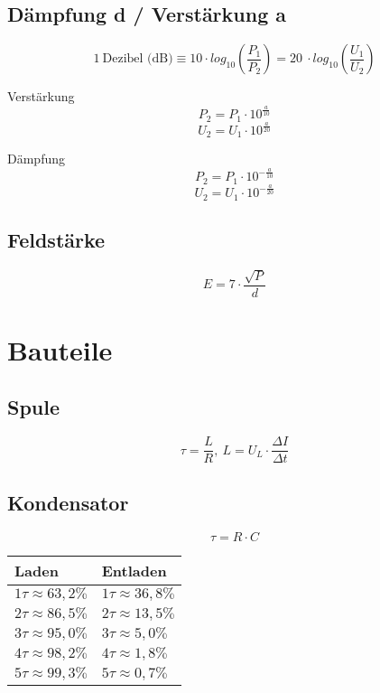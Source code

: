 \documentclass[10pt,landscape]{scrartcl}
\begin{document}
\begin{multicols}{3}
\subsection*{Dämpfung d / Verstärkung a}

$$ 1~\textrm{Dezibel (dB)} \equiv 10 \cdot log_{10}\left(\frac{P_{1}}{P_{2}}\right) = 20~\cdot log_{10}\left(\frac{U_{1}}{U_{2}}\right) $$

\noindent
\parbox[b][6em][t]{.48\columnwidth}{
\center Verstärkung
$$ P_2 = P_1 \cdot 10^\frac{a}{10}$$
$$ U_2 = U_1 \cdot 10^\frac{a}{20} $$
}
\noindent
\parbox[b][6em][t]{.48\columnwidth}{
\center Dämpfung
$$ P_2 = P_1 \cdot 10^{-\frac{a}{10}}$$
$$ U_2 = U_1 \cdot 10^{-\frac{a}{20}} $$
}

\subsection*{Feldstärke}

$$ E = 7 \cdot \frac{\sqrt{P}}{d} $$

\section{Bauteile}

\subsection*{Spule}

$$ \tau = \frac{L}{R},\ L = U_L \cdot \frac{\Delta I}{\Delta t} $$

\noindent
{}

\subsection*{Kondensator}

$$\tau = R\cdot C $$

\begin{center}
\begin{tabular}{|ll|}
\hline
Laden                   & Entladen \\
\hline
$1 \tau \approx 63,2\%$	& $1 \tau \approx 36,8\%$ \\
$2 \tau \approx 86,5\%$	& $2 \tau \approx 13,5\%$ \\
$3 \tau \approx 95,0\%$	& $3 \tau \approx 5,0\% $ \\
$4 \tau \approx 98,2\%$	& $4 \tau \approx 1,8\% $ \\
$5 \tau \approx 99,3\%$	& $5 \tau \approx 0,7\% $ \\
\hline
\end{tabular}
\end{center}


\end{multicols}
\end{document}
